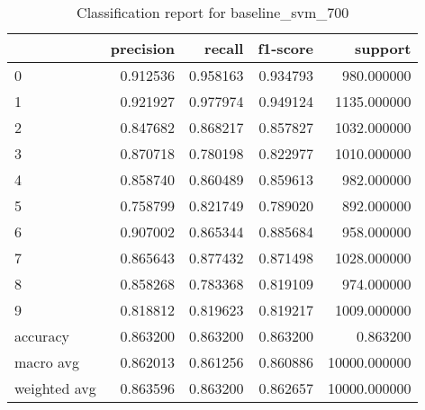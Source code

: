 \begin{table}[htb!]
\centering
\caption{Classification report for baseline_svm_700}
\label{tab:classification-report-baseline_svm_700}
\begin{tabular}{lrrrr}
\toprule
 & precision & recall & f1-score & support \\
\midrule
0 & 0.912536 & 0.958163 & 0.934793 & 980.000000 \\
1 & 0.921927 & 0.977974 & 0.949124 & 1135.000000 \\
2 & 0.847682 & 0.868217 & 0.857827 & 1032.000000 \\
3 & 0.870718 & 0.780198 & 0.822977 & 1010.000000 \\
4 & 0.858740 & 0.860489 & 0.859613 & 982.000000 \\
5 & 0.758799 & 0.821749 & 0.789020 & 892.000000 \\
6 & 0.907002 & 0.865344 & 0.885684 & 958.000000 \\
7 & 0.865643 & 0.877432 & 0.871498 & 1028.000000 \\
8 & 0.858268 & 0.783368 & 0.819109 & 974.000000 \\
9 & 0.818812 & 0.819623 & 0.819217 & 1009.000000 \\
accuracy & 0.863200 & 0.863200 & 0.863200 & 0.863200 \\
macro avg & 0.862013 & 0.861256 & 0.860886 & 10000.000000 \\
weighted avg & 0.863596 & 0.863200 & 0.862657 & 10000.000000 \\
\bottomrule
\end{tabular}
\end{table}
